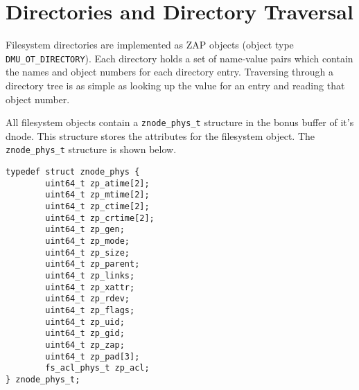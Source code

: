 \section{Directories and Directory Traversal}

Filesystem directories are implemented as ZAP objects
(object type \lstinline{DMU_OT_DIRECTORY}).
Each directory holds a set of name-value pairs
which contain the names and object numbers for each directory entry.
Traversing through a directory tree is as simple as
looking up the value for an entry and reading that object number.

All filesystem objects contain a \lstinline{znode_phys_t} structure
in the bonus buffer of it's dnode.
This structure stores the attributes for the filesystem object.
The \lstinline{znode_phys_t} structure is shown below.

\begin{lstlisting}[style=c]
typedef struct znode_phys {
        uint64_t zp_atime[2];
        uint64_t zp_mtime[2];
        uint64_t zp_ctime[2];
        uint64_t zp_crtime[2];
        uint64_t zp_gen;
        uint64_t zp_mode;
        uint64_t zp_size;
        uint64_t zp_parent;
        uint64_t zp_links;
        uint64_t zp_xattr;
        uint64_t zp_rdev;
        uint64_t zp_flags;
        uint64_t zp_uid;
        uint64_t zp_gid;
        uint64_t zp_zap;
        uint64_t zp_pad[3];
        fs_acl_phys_t zp_acl;
} znode_phys_t;
\end{lstlisting}

